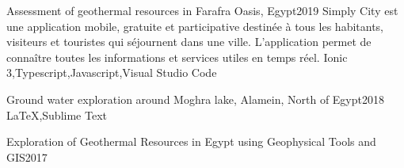 %
%
%


\begin{projects}
	\project
	{Assessment of geothermal resources in Farafra Oasis, Egypt}{2019}
	{  }
	{Simply City est une application mobile, gratuite et participative destinée à tous les habitants, visiteurs et touristes qui séjournent dans une ville. L’application permet de connaître toutes les informations et services utiles en temps réel.}
	{Ionic 3,Typescript,Javascript,Visual Studio Code}
				
	\project
	{Ground water exploration around Moghra lake, Alamein, North of Egypt}{2018}
	{}
	{}
	{\LaTeX,Sublime Text}

	\project
	{Exploration of Geothermal Resources in Egypt using Geophysical Tools and GIS}{2017}
	{} 
	{}{}
			


\end{projects}